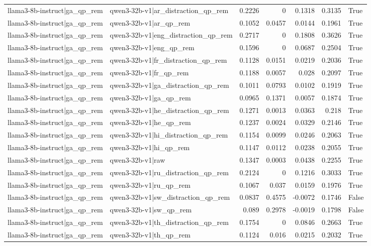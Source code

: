 \begin{table}
\begin{tabular}{l l r r r r l}
llama3-8b-instruct|ga_qp_rem & qwen3-32b-v1|ar_distraction_qp_rem & 0.2226 & 0 & 0.1318 & 0.3135 & True \\
llama3-8b-instruct|ga_qp_rem & qwen3-32b-v1|ar_qp_rem & 0.1052 & 0.0457 & 0.0144 & 0.1961 & True \\
llama3-8b-instruct|ga_qp_rem & qwen3-32b-v1|eng_distraction_qp_rem & 0.2717 & 0 & 0.1808 & 0.3626 & True \\
llama3-8b-instruct|ga_qp_rem & qwen3-32b-v1|eng_qp_rem & 0.1596 & 0 & 0.0687 & 0.2504 & True \\
llama3-8b-instruct|ga_qp_rem & qwen3-32b-v1|fr_distraction_qp_rem & 0.1128 & 0.0151 & 0.0219 & 0.2036 & True \\
llama3-8b-instruct|ga_qp_rem & qwen3-32b-v1|fr_qp_rem & 0.1188 & 0.0057 & 0.028 & 0.2097 & True \\
llama3-8b-instruct|ga_qp_rem & qwen3-32b-v1|ga_distraction_qp_rem & 0.1011 & 0.0793 & 0.0102 & 0.1919 & True \\
llama3-8b-instruct|ga_qp_rem & qwen3-32b-v1|ga_qp_rem & 0.0965 & 0.1371 & 0.0057 & 0.1874 & True \\
llama3-8b-instruct|ga_qp_rem & qwen3-32b-v1|he_distraction_qp_rem & 0.1271 & 0.0013 & 0.0363 & 0.218 & True \\
llama3-8b-instruct|ga_qp_rem & qwen3-32b-v1|he_qp_rem & 0.1237 & 0.0024 & 0.0329 & 0.2146 & True \\
llama3-8b-instruct|ga_qp_rem & qwen3-32b-v1|hi_distraction_qp_rem & 0.1154 & 0.0099 & 0.0246 & 0.2063 & True \\
llama3-8b-instruct|ga_qp_rem & qwen3-32b-v1|hi_qp_rem & 0.1147 & 0.0112 & 0.0238 & 0.2055 & True \\
llama3-8b-instruct|ga_qp_rem & qwen3-32b-v1|raw & 0.1347 & 0.0003 & 0.0438 & 0.2255 & True \\
llama3-8b-instruct|ga_qp_rem & qwen3-32b-v1|ru_distraction_qp_rem & 0.2124 & 0 & 0.1216 & 0.3033 & True \\
llama3-8b-instruct|ga_qp_rem & qwen3-32b-v1|ru_qp_rem & 0.1067 & 0.037 & 0.0159 & 0.1976 & True \\
llama3-8b-instruct|ga_qp_rem & qwen3-32b-v1|sw_distraction_qp_rem & 0.0837 & 0.4575 & -0.0072 & 0.1746 & False \\
llama3-8b-instruct|ga_qp_rem & qwen3-32b-v1|sw_qp_rem & 0.089 & 0.2978 & -0.0019 & 0.1798 & False \\
llama3-8b-instruct|ga_qp_rem & qwen3-32b-v1|th_distraction_qp_rem & 0.1754 & 0 & 0.0846 & 0.2663 & True \\
llama3-8b-instruct|ga_qp_rem & qwen3-32b-v1|th_qp_rem & 0.1124 & 0.016 & 0.0215 & 0.2032 & True \\

\end{tabular}
\end{table}
